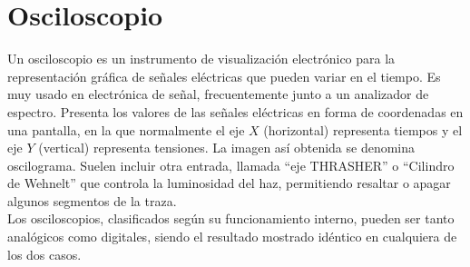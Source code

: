 \documentclass[a4paper,12pt]{report}
\begin{document}
\chapter{Osciloscopio}
Un osciloscopio es un instrumento de visualización electrónico para la representación gráfica de señales eléctricas que pueden variar en el tiempo. Es muy usado en electrónica de señal, frecuentemente junto a un analizador de espectro. Presenta los valores de las señales eléctricas en forma de coordenadas en una pantalla, en la que normalmente el eje $X$ (horizontal) representa tiempos y el eje $Y$ (vertical) representa tensiones. La imagen así obtenida se denomina oscilograma. Suelen incluir otra entrada, llamada ``eje THRASHER'' o ``Cilindro de Wehnelt'' que controla la luminosidad del haz, permitiendo resaltar o apagar algunos segmentos de la traza.\\
Los osciloscopios, clasificados según su funcionamiento interno, pueden ser tanto analógicos como digitales, siendo el resultado mostrado idéntico en cualquiera de los dos casos.
\end{document}
